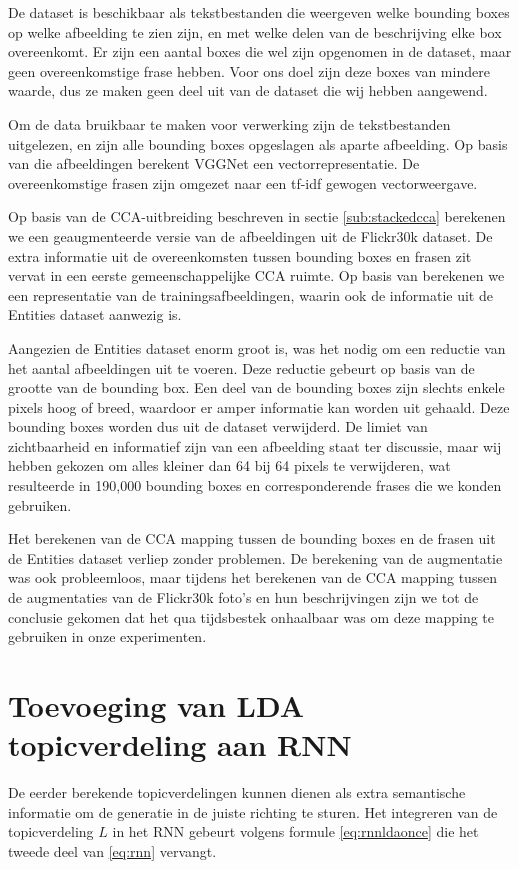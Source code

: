 De dataset is beschikbaar als tekstbestanden die weergeven welke bounding boxes op welke afbeelding te zien zijn, en met welke delen van de beschrijving elke box overeenkomt. Er zijn een aantal boxes die wel zijn opgenomen in de dataset, maar geen overeenkomstige frase hebben. Voor ons doel zijn deze boxes van mindere waarde, dus ze maken geen deel uit van de dataset die wij hebben aangewend. 

Om de data bruikbaar te maken voor verwerking zijn de tekstbestanden uitgelezen, en zijn alle bounding boxes opgeslagen als aparte afbeelding. Op basis van die afbeeldingen berekent VGGNet een vectorrepresentatie. De overeenkomstige frasen zijn omgezet naar een tf-idf gewogen vectorweergave. 

Op basis van de CCA-uitbreiding beschreven in sectie \ref{sub:stackedcca} berekenen we een geaugmenteerde versie van de afbeeldingen uit de Flickr30k dataset. De extra informatie uit de overeenkomsten tussen bounding boxes en frasen zit vervat in een eerste gemeenschappelijke CCA ruimte. Op basis van  berekenen we een representatie van de trainingsafbeeldingen, waarin ook de informatie uit de Entities dataset aanwezig is.

Aangezien de Entities dataset enorm groot is, was het nodig om een reductie van het aantal afbeeldingen uit te voeren. Deze reductie gebeurt op basis van de grootte van de bounding box. Een deel van de bounding boxes zijn slechts enkele pixels hoog of breed, waardoor er amper informatie kan worden uit gehaald. Deze bounding boxes worden dus uit de dataset verwijderd. De limiet van zichtbaarheid en informatief zijn van een afbeelding staat ter discussie, maar wij hebben gekozen om alles kleiner dan 64 bij 64 pixels te verwijderen, wat resulteerde in 190,000 bounding boxes en corresponderende frases die we konden gebruiken. 

Het berekenen van de CCA mapping tussen de bounding boxes en de frasen uit de Entities dataset verliep zonder problemen. De berekening van de augmentatie was ook probleemloos, maar tijdens het berekenen van de CCA mapping tussen de augmentaties van de Flickr30k foto's en hun beschrijvingen zijn we tot de conclusie gekomen dat het qua tijdsbestek onhaalbaar was om deze mapping te gebruiken in onze experimenten. 


\section{Toevoeging van LDA topicverdeling aan RNN}
De eerder berekende topicverdelingen kunnen dienen als extra semantische informatie om de generatie in de juiste richting te sturen. Het integreren van de topicverdeling $L$ in het RNN gebeurt volgens formule \eqref{eq:rnnldaonce} die het tweede deel van \eqref{eq:rnn} vervangt.

